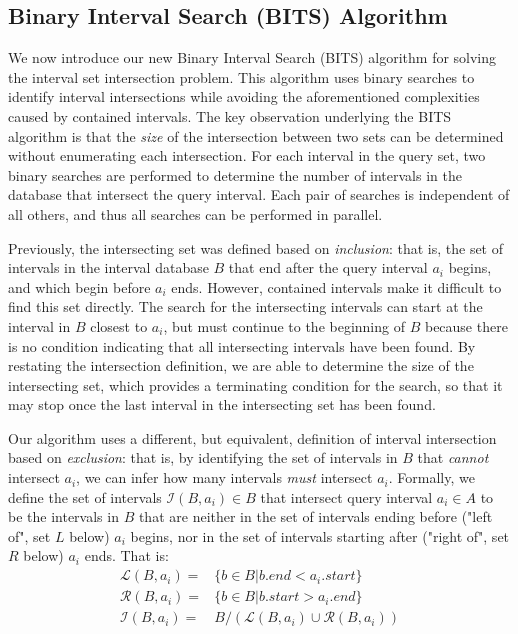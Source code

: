 \documentclass{bioinfo}
\begin{document}
	
	\subsection{Binary Interval Search (BITS) Algorithm}
	We now introduce our new Binary Interval Search (BITS) algorithm for solving
	the interval set intersection problem.  This algorithm uses binary searches
	to identify interval intersections while avoiding the aforementioned
	complexities caused by contained intervals. The key observation underlying the BITS 
	algorithm is that the \emph{size} of the intersection between two sets can be 
	determined without enumerating each intersection.  For each interval 
	in the query set, two binary searches are performed to determine the number
	of intervals in the database that intersect the query interval.  Each pair of
	searches is independent of all others, and thus all searches can be
	performed in parallel.  
	
	Previously, the intersecting set was defined based on \emph{inclusion}:
	that is, the set of intervals in the interval database $B$ that end after the query
	interval $a_i$ begins, and which begin before $a_i$ ends.  However,
	contained intervals make it difficult to find this set directly.  The
	search for the intersecting intervals can start at the interval in $B$
	closest to $a_i$, but must continue to the beginning of $B$ because
	there is no condition indicating that all intersecting intervals have
	been found.  By restating the intersection definition, we are able to
	determine the size of the intersecting set, which provides a
	terminating condition for the search, so that it may stop once the
	last interval in the intersecting set has been found.

	Our algorithm uses a different, but equivalent, definition of interval
	intersection based on \emph{exclusion}: that is, by identifying the set of 
	intervals in $B$ that \emph{cannot} intersect $a_i$, we can infer how many intervals
	\emph{must} intersect $a_i$. Formally, we define the set of intervals $\mathcal{I}(B,a_i) \in B$ that
	intersect query interval $a_i\in A$ to be the intervals in $B$ that
	are neither in the set of intervals ending before ("left of", set $L$ below) $a_i$ begins,
	nor in the set of intervals starting after ("right of", set $R$ below) $a_i$ ends.  That is:
	\begin{equation*}
		\begin{split}
			\mathcal{L}(B,a_i) = &\{b\in B| b.end < a_i.start\} \\
			\mathcal{R}(B,a_i) = &\{b\in B| b.start > a_i.end\} \\
			\mathcal{I}(B,a_i) = &B / (\mathcal{L}(B,a_i) \cup \mathcal{R}(B,a_i))
		\end{split}
	\end{equation*}
\end{document}
